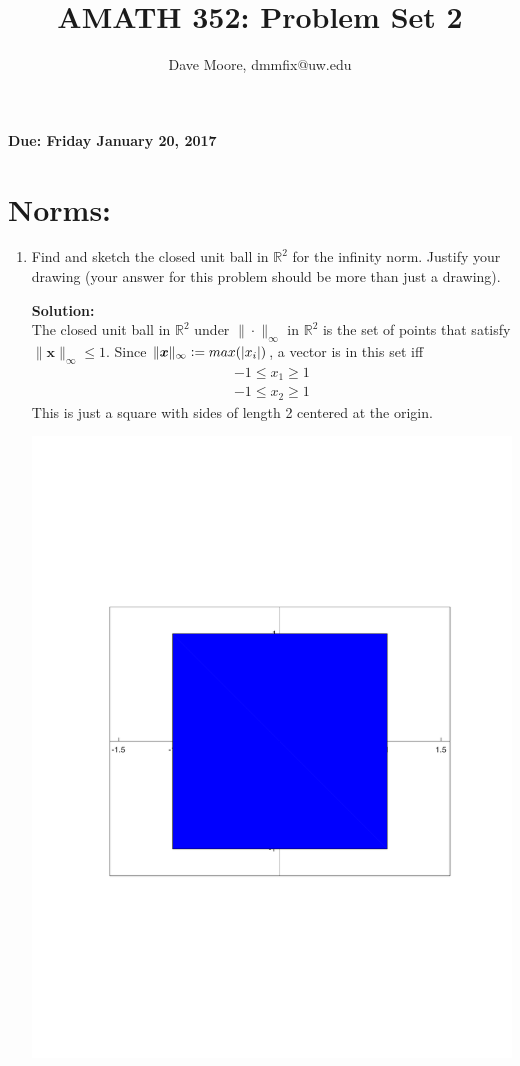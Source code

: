 \documentclass[]{article}
\title{AMATH 352: Problem Set 2}
\author{Dave Moore, dmmfix@uw.edu}
\newcommand{\R}{\mathbb{R}}
\newcommand{\defeq}{\vcentcolon=}
\newcommand{\solution}{\vskip 0.5cm \textbf{\large Solution:} \\}
\begin{document}
\maketitle
    {\Large \textbf{Due: Friday January 20, 2017}}

    \section*{Norms:}
    \begin{enumerate}
	\item Find and sketch the closed unit ball in $\R^2$ for the infinity norm. Justify your drawing (your answer for this problem should be more than just a drawing).

	  \solution
      
	  The closed unit ball in $\R^2$ under $\|\cdot\|_{\infty}$
      in $\R^2$ is the set of points that satisfy $\|\bm{x}\|_{\infty}
      \leq 1$. Since $\|\bm{x}\|_{\infty} \defeq max(|x_i|)$, a vector is
      in this set iff
      \begin{gather*}
        -1 \leq x_1 \geq 1 \\
        -1 \leq x_2 \geq 1
      \end{gather*}
      This is just a square with sides of length 2 centered at the origin.
      \begin{center}
        \includegraphics[scale=0.5]{unit_sphere_supnorm.pdf}
      \end{center}
    \end{enumerate}
\end{document}

